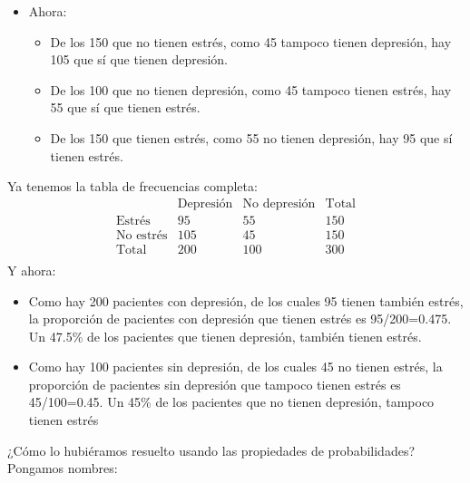 \documentclass[
  spanish,
  letterpaper,
  DIV=11,
  numbers=noendperiod]{scrreprt}
\providecommand{\tightlist}{%
  \setlength{\itemsep}{0pt}\setlength{\parskip}{0pt}}
\begin{document}
\begin{tcolorbox}
\begin{itemize}
  En resumen, por ahora tenemos que \[
  \begin{array}{r|c|c|c}
  & \text{Depresión} & \text{No depresión} & \text{Total}\\ \hline
  \text{Estrés} & &  & 150 \\ \hline
  \text{No estrés} &   & 45 & 150 \\ \hline
  \text{Total} &  200 & 100 & 300\\ 
  \end{array}
  \]
\item
  Ahora:

  \begin{itemize}
  \tightlist
  \item
    De los 150 que no tienen estrés, como 45 tampoco tienen depresión,
    hay 105 que sí que tienen depresión.
  \item
    De los 100 que no tienen depresión, como 45 tampoco tienen estrés,
    hay 55 que sí que tienen estrés.
  \item
    De los 150 que tienen estrés, como 55 no tienen depresión, hay 95
    que sí tienen estrés.
  \end{itemize}
\end{itemize}

Ya tenemos la tabla de frecuencias completa: \[
\begin{array}{r|c|c|c}
& \text{Depresión} & \text{No depresión} & \text{Total}\\ \hline
\text{Estrés} & 95 & 55 & 150 \\ \hline
\text{No estrés} & 105 & 45 & 150 \\ \hline
\text{Total} &  200 & 100 & 300\\ 
\end{array}
\] Y ahora:

\begin{itemize}
\item
  Como hay 200 pacientes con depresión, de los cuales 95 tienen también
  estrés, la proporción de pacientes con depresión que tienen estrés es
  95/200=0.475. Un 47.5\% de los pacientes que tienen depresión, también
  tienen estrés.
\item
  Como hay 100 pacientes sin depresión, de los cuales 45 no tienen
  estrés, la proporción de pacientes sin depresión que tampoco tienen
  estrés es 45/100=0.45. Un 45\% de los pacientes que no tienen
  depresión, tampoco tienen estrés
\end{itemize}

¿Cómo lo hubiéramos resuelto usando las propiedades de probabilidades?
Pongamos nombres:


\end{tcolorbox}
\end{document}
